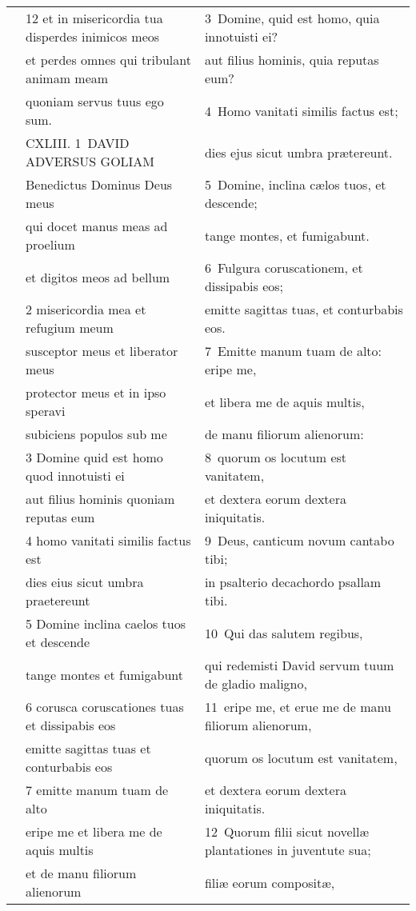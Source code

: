 \documentclass{article}
\begin{document}
\begin{longtable}{@{}p{}p{}p{}@{}}
	&	12 et in misericordia tua disperdes inimicos meos	&	3 Domine, quid est homo, quia innotuisti ei?	\\
	&	et perdes omnes qui tribulant animam meam	&	aut filius hominis, quia reputas eum?	\\
	&	quoniam servus tuus ego sum.	&	4 Homo vanitati similis factus est;	\\
	&	CXLIII. 1 DAVID ADVERSUS GOLIAM	&	dies ejus sicut umbra prætereunt.	\\
	&	Benedictus Dominus Deus meus	&	5 Domine, inclina cælos tuos, et descende;	\\
	&	qui docet manus meas ad proelium	&	tange montes, et fumigabunt.	\\
	&	et digitos meos ad bellum	&	6 Fulgura coruscationem, et dissipabis eos;	\\
	&	2 misericordia mea et refugium meum	&	emitte sagittas tuas, et conturbabis eos.	\\
	&	susceptor meus et liberator meus	&	7 Emitte manum tuam de alto: eripe me,	\\
	&	protector meus et in ipso speravi	&	et libera me de aquis multis,	\\
	&	subiciens populos sub me	&	de manu filiorum alienorum:	\\
	&	3 Domine quid est homo quod innotuisti ei	&	8 quorum os locutum est vanitatem,	\\
	&	aut filius hominis quoniam reputas eum	&	et dextera eorum dextera iniquitatis.	\\
	&	4 homo vanitati similis factus est	&	9 Deus, canticum novum cantabo tibi;	\\
	&	dies eius sicut umbra praetereunt	&	in psalterio decachordo psallam tibi.	\\
	&	5 Domine inclina caelos tuos et descende	&	10 Qui das salutem regibus,	\\
	&	tange montes et fumigabunt	&	qui redemisti David servum tuum de gladio maligno,	\\
	&	6 corusca coruscationes tuas et dissipabis eos	&	11 eripe me, et erue me de manu filiorum alienorum,	\\
	&	emitte sagittas tuas et conturbabis eos	&	quorum os locutum est vanitatem,	\\
	&	7 emitte manum tuam de alto	&	et dextera eorum dextera iniquitatis.	\\
	&	eripe me et libera me de aquis multis	&	12 Quorum filii sicut novellæ plantationes in juventute sua;	\\
	&	et de manu filiorum alienorum	&	filiæ eorum compositæ,	\\

\end{longtable}
\end{document}
